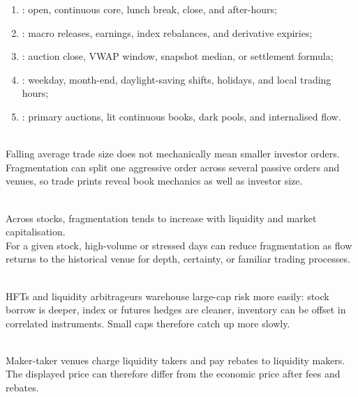 \documentclass[a4paper,oneside,openany]{book}
\begin{document}
\begin{taxonomy} 
\begin{enumerate}[label=\roman*.]
\setlength{\itemsep}{0pt}
\item {}: open, continuous core, lunch break, close, and after-hours;
\item {}: macro releases, earnings, index rebalances, and derivative expiries;
\item {}: auction close, VWAP window, snapshot median, or settlement formula;
\item {}: weekday, month-end, daylight-saving shifts, holidays, and local trading hours;
\item {}: primary auctions, lit continuous books, dark pools, and internalised flow.
\end{enumerate}
\end{taxonomy}

\begin{caveat} \\
Falling average trade size does not mechanically mean smaller investor orders.\\
Fragmentation can split one aggressive order across several passive orders and venues, so trade prints reveal book mechanics as well as investor size.
\end{caveat}

\begin{empiricalfinding} \\
Across stocks, fragmentation tends to increase with liquidity and market capitalisation.\\
For a given stock, high-volume or stressed days can reduce fragmentation as flow returns to the historical venue for depth, certainty, or familiar trading processes.
\end{empiricalfinding}

\begin{mechanism} \\
HFTs and liquidity arbitrageurs warehouse large-cap risk more easily: stock borrow is deeper, index or futures hedges are cleaner, inventory can be offset in correlated instruments. Small caps therefore catch up more slowly.
\end{mechanism}

\begin{marketrule} \\
Maker-taker venues charge liquidity takers and pay rebates to liquidity makers. The displayed price can therefore differ from the economic price after fees and rebates.
\end{marketrule}
\end{document}
